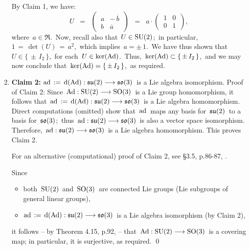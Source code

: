 \begin{enumerate}
	\vskip 0.3cm
	\noindent
	By Claim 1, we have:
	\begin{equation*}
	U
	\;\; = \;\;
		\left(\,\begin{array}{rr}
			a & -\,\overline{b}
			\\
			b & \overline{a}
			\end{array}\,\right)
	\;\; = \;\;
		a \cdot
		\left(\,\begin{array}{rr}
			1 & 0
			\\
			0 & 1
			\end{array}\,\right),
	\end{equation*}
	where \,$a \in \Re$.\,
	Now, recall also that \,$U \in \textnormal{SU}(2)$;\, in particular, \,$1 \,=\, \det(U) \,=\, a^{2}$,\,
	which implies \,$a = \pm\,1$.\,
	We have thus shown that \,$U \in \{\,\pm\,I_{2}\,\}$,\,
	for each \,$U \in \ker(\textnormal{Ad})$.\,
	Thus, \,$\ker(\textnormal{Ad}) \subset \{\,\pm\,I_{2}\,\}$,\,
	and we may now conclude that \,$\ker(\textnormal{Ad}) = \{\,\pm\,I_{2}\,\}$,\,
	as required.
\item
	\noindent
	\textbf{Claim 2:}\quad
	$\textnormal{ad} \, := \, \textnormal{d}(\textnormal{Ad}) : \mathfrak{su}(2) \longrightarrow \mathfrak{so}(3)$\,
	is a Lie algebra isomorphism.
	\vskip -0.01cm
	\noindent
	Proof of Claim 2:\;\;
	Since
	\,$\textnormal{Ad} : \textnormal{SU}(2) \longrightarrow \textnormal{SO}(3)$\,
	is a Lie group homomorphism, it follows that
	\,$\textnormal{ad} \, := \, \textnormal{d}(\textnormal{Ad}) : \mathfrak{su}(2) \longrightarrow \mathfrak{so}(3)$\,
	is a Lie algebra homomorphism.
	Direct computations (omitted) show that \,$\textnormal{ad}$\, maps
	any basis for \,$\mathfrak{su}(2)$\, to a basis for \,$\mathfrak{so}(3)$;\, thus
	\,$\textnormal{ad} : \mathfrak{su}(2) \longrightarrow \mathfrak{so}(3)$\,
	is also a vector space isomorphism.
	Therefore,
	\,$\textnormal{ad} : \mathfrak{su}(2) \longrightarrow \mathfrak{so}(3)$\,
	is a Lie algebra homomorphism.
	This proves Claim 2.
	
	\vskip 0.2cm
	\noindent
	For an alternative (computational) proof of Claim 2, see \S3.5, p.86-87, \cite{Baker2002}.

	\vskip 0.2cm
	\noindent
	Since
	\begin{itemize}
	\item
		both \,$\textnormal{SU}(2)$\, and \,$\textnormal{SO}(3)$\, are connected Lie groups (Lie subgroups of general linear groups),
	\item
		$\textnormal{ad} \, := \, \textnormal{d}(\textnormal{Ad}) : \mathfrak{su}(2) \longrightarrow \mathfrak{so}(3)$\,
		is a Lie algebra isomorphism (by Claim 2),
	\end{itemize}
	it follows -- by Theorem 4.15, p.92, \cite{Sepanski2010} -- that
	\,$\textnormal{Ad} : \textnormal{SU}(2) \longrightarrow \textnormal{SO}(3)$\,
	is a covering map; in particular, it is surjective, as required.
	\qed
\end{enumerate}

